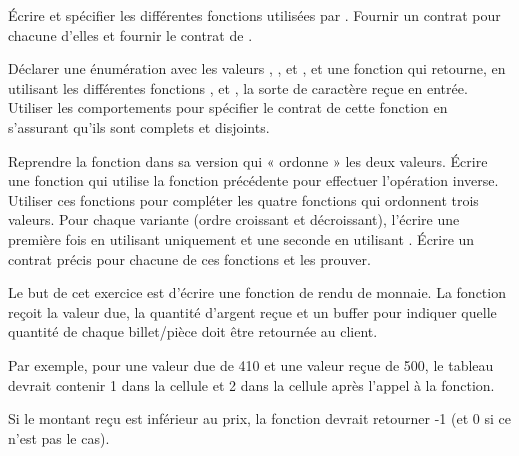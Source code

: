 

\label{l4:contract-modularity-ex-alpha-num}


Écrire et spécifier les différentes fonctions utilisées par
. Fournir un contrat pour chacune d'elles et
fournir le contrat de .





Déclarer une énumération avec les valeurs , ,
 et , et une fonction 
qui retourne, en utilisant les différentes fonctions ,
 et , la sorte de caractère reçue
en entrée. Utiliser les comportements pour spécifier le contrat de cette fonction
en s'assurant qu'ils sont complets et disjoints.





Reprendre la fonction  dans sa version qui « ordonne »
les deux valeurs. Écrire une fonction  qui utilise la
fonction précédente pour effectuer l'opération inverse. Utiliser ces fonctions
pour compléter les quatre fonctions qui ordonnent trois valeurs. Pour chaque
variante (ordre croissant et décroissant), l'écrire une première fois en
utilisant uniquement  et une seconde en utilisant
. Écrire un contrat précis pour chacune de ces fonctions
et les prouver.






Le but de cet exercice est d'écrire une fonction de rendu de monnaie. La
fonction  reçoit la valeur due, la quantité
d'argent reçue et un buffer pour indiquer quelle quantité de chaque
billet/pièce doit être retournée au client.


Par exemple, pour une valeur due de 410 et une valeur reçue de 500, le
tableau devrait contenir 1 dans la cellule  et
2 dans la cellule  après l'appel à la fonction.


Si le montant reçu est inférieur au prix, la fonction devrait retourner
-1 (et 0 si ce n'est pas le cas).


